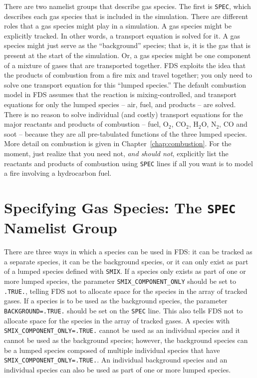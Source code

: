 \documentclass[11pt]{book}
\newcommand{\ct}{\tt\small}
\begin{document}
There are two namelist groups that describe gas species. The first is {\ct SPEC}, which describes each gas species that is included in the simulation. There are different roles that a gas species might play in a simulation. A gas species might be explicitly tracked. In other words, a transport equation is solved for it. A gas species might just serve as the ``background'' species; that is, it is
the gas that is present at the start of the simulation. Or, a gas species might be one component of a mixture of gases that are transported together. FDS exploits the idea that the products of combustion from a fire mix and travel together; you only need to solve
one transport equation for this ``lumped species.'' The default combustion model in FDS assumes that the reaction is mixing-controlled, and transport equations for only the lumped species -- air, fuel, and products -- are solved.  There is no reason to solve individual (and costly) transport equations for the major reactants and products of combustion -- fuel, O$_2$, CO$_2$, H$_2$O, N$_2$, CO and soot -- because they are all pre-tabulated functions of the three lumped species. More detail on combustion is given in Chapter~\ref{chap:combustion}. For the moment, just realize that you need not, {\em and should not}, explicitly list the reactants and products of combustion using {\ct SPEC} lines if all you want is to model a fire involving a hydrocarbon fuel.



\section{Specifying Gas Species: The \texorpdfstring{{\tt SPEC}}{SPEC} Namelist Group}
\label{info:SPEC}

There are three ways in which a species can be used in FDS: it can be tracked as a separate species, it can be the background species, or it can only exist as part of a lumped species defined with {\ct SMIX}. If a species only exists as part of one or more lumped species, the parameter {\ct SMIX\_COMPONENT\_ONLY} should be set to {\ct .TRUE.}, telling FDS not to allocate space for the species in the array of tracked gases. If a species is to be used as the background species, the parameter {\ct BACKGROUND=.TRUE.} should be set on the {\ct SPEC} line. This also tells FDS not to allocate space for the species in the array of tracked gases. A species with {\ct SMIX\_COMPONENT\_ONLY=.TRUE.} cannot be used as an individual species and it cannot be used as the background species; however, the background species  can be a lumped species composed of multiple individual species that have {\ct SMIX\_COMPONENT\_ONLY=.TRUE.}. An individual background species and an individual species can also be used as part of one or more lumped species.
\end{document}
